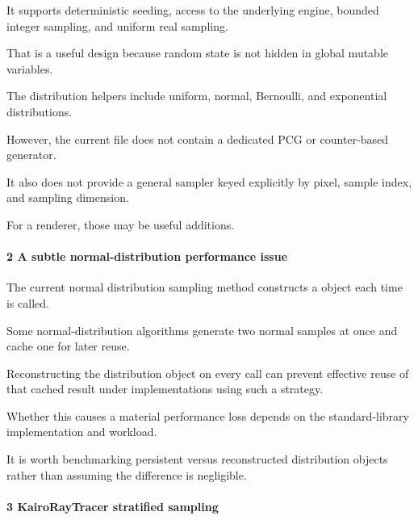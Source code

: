 It supports deterministic seeding, access to the underlying engine, bounded integer sampling, and uniform real sampling.

That is a useful design because random state is not hidden in global mutable variables.

The distribution helpers include uniform, normal, Bernoulli, and exponential distributions.

However, the current file does not contain a dedicated PCG or counter-based generator.

It also does not provide a general sampler keyed explicitly by pixel, sample index, and sampling dimension.

For a renderer, those may be useful additions.

\paragraph{2 A subtle normal-distribution performance issue}\label{02-foundations-ii-ch039-a-subtle-normal-distribution-performance-issue}

\hypertarget{02-foundations-ii-ch039-a-subtle-normal-distribution-performance-issue}{}

The current normal distribution sampling method constructs a  object each time  is called.

Some normal-distribution algorithms generate two normal samples at once and cache one for later reuse.

Reconstructing the distribution object on every call can prevent effective reuse of that cached result under implementations using such a strategy.

Whether this causes a material performance loss depends on the standard-library implementation and workload.

It is worth benchmarking persistent versus reconstructed distribution objects rather than assuming the difference is negligible.

\paragraph{3 KairoRayTracer stratified sampling}\label{02-foundations-ii-ch039-kairoraytracer-stratified-sampling}

\hypertarget{02-foundations-ii-ch039-kairoraytracer-stratified-sampling}{}

